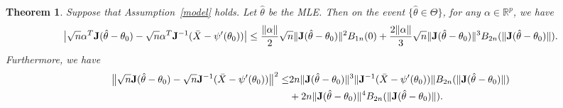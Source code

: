 \documentclass[11pt, letterpaper]{article}
\theoremstyle{plain}
\newtheorem{theorem}{\quad\quad Theorem}
\theoremstyle{definition}
\theoremstyle{remark}
\begin{document}
\begin{theorem}
    Suppose that Assumption~\ref{model} holds. Let $\hat{\theta}$ be the MLE.
    Then on the event  $\{\hat{\theta}\in \Theta\}$, for any $\alpha\in \mathbb{R}^p$, we have 
    $$
    \big|\sqrt{n}\alpha^T \mathbf{J} (\hat{\theta}-\theta_0)-\sqrt{n}\alpha^T \mathbf{J}^{-1}(\bar{X}-\psi'(\theta_0))\big|\leq
    \frac{\|\alpha\|}{2}\sqrt{n}\|\mathbf{J} (\hat{\theta}-\theta_0)\|^2 B_{1n}(0)+
    \frac{2\|\alpha\|}{3}\sqrt{n}\|\mathbf{J}(\hat{\theta}-\theta_0)\|^3 B_{2n}(\|\mathbf{J}(\hat{\theta}-\theta_0)\|).
    $$
    Furthermore, we have
    $$
    \begin{aligned}
    \big\|\sqrt{n}\mathbf{J}(\hat{\theta}-\theta_0)-\sqrt{n}\mathbf{J}^{-1}(\bar{X}-\psi'(\theta_0))\big\|^2 \leq
        &        2 n \|\mathbf{J} (\hat{\theta}-\theta_0)\|^3\|\mathbf{J}^{-1}(\bar{X}-\psi'(\theta_0))\| B_{2n}(\|\mathbf{J}(\hat{\theta}-\theta_0)\|)\\
        &+ 2 n\|\mathbf{J}(\hat{\theta}-\theta_0)\|^4 B_{2n}(\|\mathbf{J} (\hat{\theta}-\theta_0)\|).
    \end{aligned}
    $$
\end{theorem}
\end{document}
